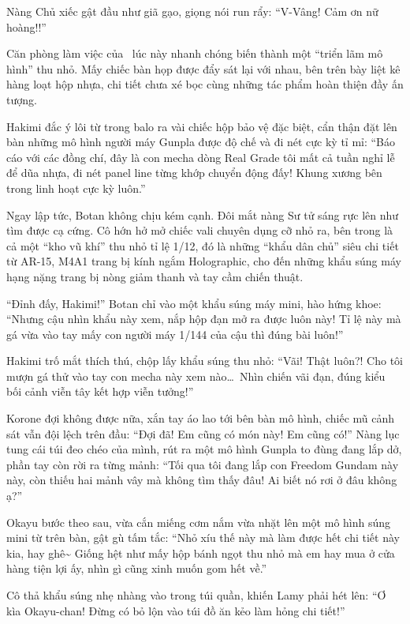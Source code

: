\documentclass[../main.tex]{subfiles}
\begin{document}
Nàng Chủ xiếc gật đầu như giã gạo, giọng nói run rẩy: ``V-Vâng! Cảm ơn nữ hoàng!!''

\ct

Căn phòng làm việc của \hll\ lúc này nhanh chóng biến thành một ``triển lãm mô hình'' thu nhỏ. Mấy chiếc bàn họp được đẩy sát lại với nhau, bên trên bày liệt kê hàng loạt hộp nhựa, chi tiết chưa xé bọc cùng những tác phẩm hoàn thiện đầy ấn tượng.

Hakimi đắc ý lôi từ trong balo ra vài chiếc hộp bảo vệ đặc biệt, cẩn thận đặt lên bàn những mô hình người máy Gunpla được độ chế và đi nét cực kỳ tỉ mỉ: ``Báo cáo với các đồng chí, đây là con mecha dòng Real Grade tôi mất cả tuần nghỉ lễ để dũa nhựa, đi nét panel line từng khớp chuyển động đấy! Khung xương bên trong linh hoạt cực kỳ luôn.''

Ngay lập tức, Botan không chịu kém cạnh. Đôi mắt nàng Sư tử sáng rực lên như tìm được cạ cứng. Cô hớn hở mở chiếc vali chuyên dụng cỡ nhỏ ra, bên trong là cả một ``kho vũ khí'' thu nhỏ tỉ lệ 1/12, đó là những ``khẩu dân chủ'' siêu chi tiết từ AR-15, M4A1 trang bị kính ngắm Holographic, cho đến những khẩu súng máy hạng nặng trang bị nòng giảm thanh và tay cầm chiến thuật.

``Đỉnh đấy, Hakimi!'' Botan chỉ vào một khẩu súng máy mini, hào hứng khoe: ``Nhưng cậu nhìn khẩu này xem, nắp hộp đạn mở ra được luôn này! Tỉ lệ này mà gá vừa vào tay mấy con người máy 1/144 của cậu thì đúng bài luôn!''

Hakimi trố mắt thích thú, chộp lấy khẩu súng thu nhỏ: ``Vãi! Thật luôn?! Cho tôi mượn gá thử vào tay con mecha này xem nào\dots\ Nhìn chiến vãi đạn, đúng kiểu bối cảnh viễn tây kết hợp viễn tưởng!''

Korone đợi không được nữa, xắn tay áo lao tới bên bàn mô hình, chiếc mũ cảnh sát vẫn đội lệch trên đầu: ``Đợi đã! Em cũng có món này! Em cũng có!'' Nàng lục tung cái túi đeo chéo của mình, rút ra một mô hình Gunpla to đùng đang lắp dở, phần tay còn rời ra từng mảnh: ``Tối qua tôi đang lắp con Freedom Gundam này này, còn thiếu hai mảnh vây mà không tìm thấy đâu! Ai biết nó rơi ở đâu không ạ?''

Okayu bước theo sau, vừa cắn miếng cơm nắm vừa nhặt lên một mô hình súng mini từ trên bàn, gật gù tấm tắc: ``Nhỏ xíu thế này mà làm được hết chi tiết này kia, hay ghê\~{} Giống hệt như mấy hộp bánh ngọt thu nhỏ mà em hay mua ở cửa hàng tiện lợi ấy, nhìn gì cũng xinh muốn gom hết về.'' 

Cô thả khẩu súng nhẹ nhàng vào trong túi quần, khiến Lamy phải hét lên: ``Ơ kìa Okayu-chan! Đừng có bỏ lộn vào túi đồ ăn kẻo làm hỏng chi tiết!''
\end{document}
